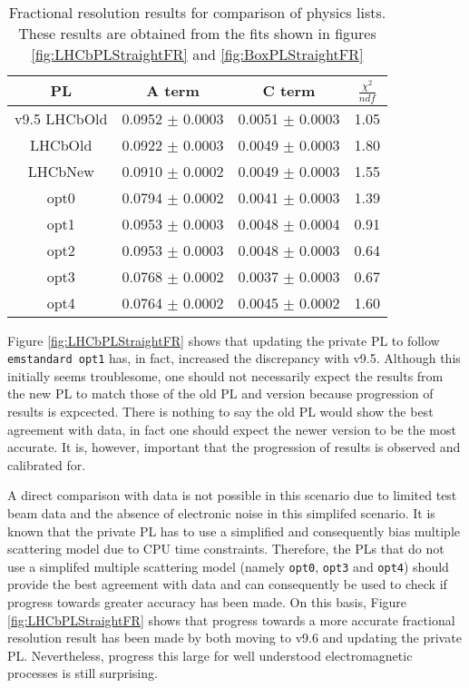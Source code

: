 \begin{table}[h]
  \centering
  \begin{tabular}{|c|c|c|c|}
      \hline
      PL & A term & C term & $\frac{\chi^2}{ndf}$  \\ \hline
      v9.5 LHCbOld & 0.0952 $\pm$ 0.0003 & 0.0051 $\pm$ 0.0003 & 1.05 \\ \hline
      LHCbOld & 0.0922 $\pm$ 0.0003 & 0.0049 $\pm$ 0.0003 & 1.80 \\ \hline 
      LHCbNew & 0.0910 $\pm$ 0.0002 & 0.0049 $\pm$ 0.0003 & 1.55 \\ \hline
      opt0 & 0.0794 $\pm$ 0.0002 & 0.0041 $\pm$ 0.0003 & 1.39 \\ \hline
      opt1 & 0.0953 $\pm$ 0.0003 & 0.0048 $\pm$ 0.0004 & 0.91 \\ \hline
      opt2 & 0.0953 $\pm$ 0.0003 & 0.0048 $\pm$ 0.0003 & 0.64 \\ \hline 
      opt3 & 0.0768 $\pm$ 0.0002 & 0.0037 $\pm$ 0.0003 & 0.67 \\ \hline 
      opt4 & 0.0764 $\pm$ 0.0002 & 0.0045 $\pm$ 0.0002 & 1.60 \\ \hline
  \end{tabular}
  \caption{Fractional resolution results for comparison of \geant physics lists.  These results are obtained from the fits shown in figures \ref{fig:LHCbPLStraightFR} and \ref{fig:BoxPLStraightFR}}
  \label{tab:AllPL}
\end{table}

Figure \ref{fig:LHCbPLStraightFR} shows that updating the \lhcb private PL to follow \texttt{emstandard opt1} has, in fact, increased the discrepancy with v9.5.  Although this initially seems troublesome, one should not necessarily expect the results from the new PL to match those of the old PL and \geant version because progression of results is expcected.  There is nothing to say the old PL would show the best agreement with data, in fact one should expect the newer version to be the most accurate.  It is, however, important that the progression of results is observed and calibrated for.

A direct comparison with data is not possible in this scenario due to limited test beam data and the absence of electronic noise in this simplifed scenario.   It is known that the \lhcb private PL has to use a simplified and consequently bias multiple scattering model due to CPU time constraints.  Therefore, the PLs that do not use a simplifed multiple scattering model (namely \texttt{opt0}, \texttt{opt3} and \texttt{opt4}) should provide the best agreement with data and can consequently be used to check if progress towards greater accuracy has been made.  On this basis, Figure \ref{fig:LHCbPLStraightFR} shows that progress towards a more accurate fractional resolution result has been made by both moving to \geant v9.6 and updating the \lhcb private PL. Nevertheless, progress this large for well understood electromagnetic processes is still surprising.

